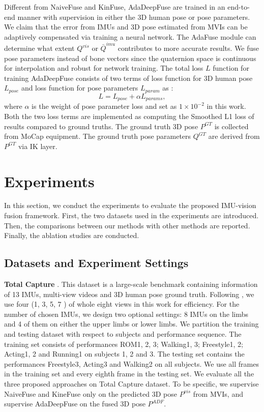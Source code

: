 \documentclass[lettersize,journal]{IEEEtran}
\begin{document}
Different from NaiveFuse and KinFuse, AdaDeepFuse are trained in an end-to-end manner with supervision in either the 3D human pose or pose parameters. We claim that the error from IMUs and 3D pose estimated from MVIs can be adaptively compensated via training a neural network. The AdaFuse module can determine what extent $Q^{vis}$ or $\bar{Q}^{imu}$ contributes to more accurate results. We fuse pose parameters instead of bone vectors since the quaternion space is continuous for interpolation and robust for network training. The total loss $L$ function for training AdaDeepFuse consists of two terms of loss function for 3D human pose $L_{pose}$ and loss function for pose parameters $L_{param}$ as :
\begin{equation}
L = L_{pose} + \alpha L_{params},
\end{equation}
where $\alpha$ is the weight of pose parameter loss and set as $1 \times 10^{-2}$ in this work. Both the two loss terms are implemented as computing the Smoothed L1 loss of results compared to ground truths. The ground truth 3D pose $P^{GT}$ is collected from MoCap equipment. The ground truth pose parameters $Q^{GT}$ are derived from $P^{GT}$ via IK layer.
\section{Experiments}

In this section, we conduct the experiments to evaluate the proposed IMU-vision fusion framework. First, the two datasets used in the experiments are introduced. Then, the comparisons between our methods with other methods are reported. Finally, the ablation studies are conducted.

\subsection{Datasets and Experiment Settings}

\noindent \textbf{Total Capture} \cite{trumble2017total}.
\quad This dataset is a large-scale benchmark containing information of 13 IMUs, multi-view videos and 3D human pose ground truth. Following \cite{zhang2020fusing,trumble2017total}, we use four (1, 3, 5, 7 ) of whole eight views in this work for efficiency. For the number of chosen IMUs, we design two optional settings: 8 IMUs on the limbs and 4 of them on either the upper limbs or lower limbs. We partition the training and testing dataset with respect to subjects and performance sequence. The training set consists of performances ROM1, 2, 3; Walking1, 3; Freestyle1, 2; Acting1, 2 and Running1 on subjects 1, 2 and 3. The testing set contains the performances Freestyle3, Acting3 and Walking2 on all subjects. We use all frames in the training set and every eighth frame in the testing set. We evaluate all the three proposed approaches on Total Capture dataset. To be specific, we supervise NaiveFuse and KineFuse only on the predicted 3D pose $P^{vis}$ from MVIs, and supervise AdaDeepFuse on the fused 3D pose $P^{ADF}$.
\end{document}
